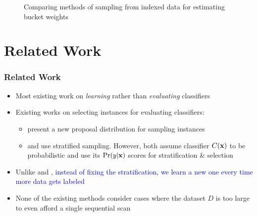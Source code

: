 \documentclass[11pt]{beamer}
\newcommand{\vek}[1]{{\bf {#1}}}
\newcommand{\vx}{{\vek{x}}}
\newlength{\wideitemsep}
\let\olditem\item
\renewcommand{\item}{\setlength{\itemsep}{\wideitemsep}\olditem}
\begin{document}
\begin{frame}
\begin{center}
\begin{figure}
\begin{minipage}[b]{0.45\linewidth}
\begin{center}
\caption{\tiny{Comparing methods of sampling from indexed data for
  estimating bucket weights}}
\end{center}  
\end{minipage}
\end{figure}
\end{center}

\end{frame}

\section{Related Work}
\begin{frame}
\frametitle{Related Work}
\begin{itemize}
\pause
\item Most existing work on \textit{learning} rather than \textit{evaluating} classifiers
\pause
\item Existing works on selecting instances for evaluating classifiers:
\begin{itemize}
\item \citep{sawade10} present a new proposal distribution for sampling instances
\item \citep{bennett10} and \citep{druck11} use stratified sampling. However, both assume classifier $C(\vx)$ to be probabilistic and use its $\Pr(y|\vx)$ scores for stratification \& selection
\end{itemize}
\pause
\item Unlike \citep{bennett10} and \citep{druck11}, \textcolor{blue}{instead of fixing the stratification, we learn a new one every time more data gets labeled}
\pause
\item None of the existing methods consider cases where the dataset $D$ is too large to even afford a single sequential scan %
\end{itemize}
\end{frame}

\end{document}
